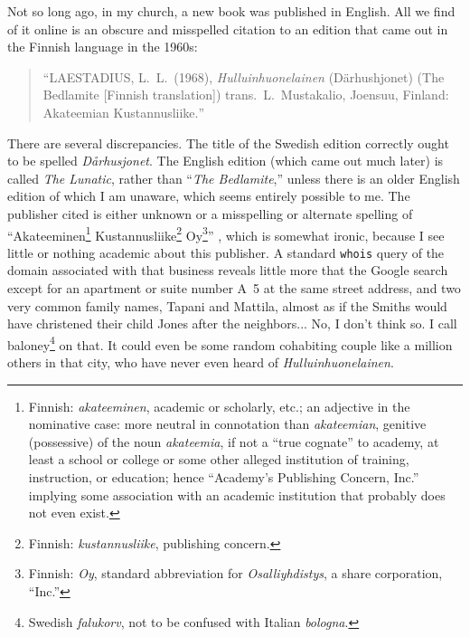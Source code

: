 \documentclass[letterpaper]{article}
\begin{document}
Not so long ago, in my church, a new book was published in English.  All we find of it online is an obscure and misspelled citation \cite{hagglund1994religious} to an edition that came out in the Finnish language in the 1960s:
\begin{verse}
``LAESTADIUS, L.\ L.\ (1968), \foreignlanguage{finnish}{\textit{Hulluinhuonelainen}} \foreignlanguage{swedish}{(D{\"a}rhushjonet)} (The Bedlamite [Finnish translation]) trans.\ \foreignlanguage{finnish}{L.\ Mustakalio, Joensuu,} Finland: \foreignlanguage{finnish}{Akateemian Kustannusliike.}''
\end{verse}
There are several discrepancies. The title of the Swedish edition correctly ought to be spelled \textit{D{\aa}rhusjonet}.  The English edition (which came out much later) is called \textit{The Lunatic}, rather than ``\textit{The Bedlamite},'' unless there is an older English edition of which I am unaware, which seems entirely possible to me.   The publisher cited is either unknown or a misspelling or alternate spelling of ``Akateeminen\footnote{Finnish: \foreignlanguage{finnish}{\textit{akateeminen}}, academic or scholarly, etc.; an adjective in the nominative case: more neutral in connotation than \foreignlanguage{finnish}{\textit{akateemian}}, genitive (possessive) of the noun \foreignlanguage{finnish}{\textit{akateemia}}, if not a ``true cognate'' to academy, at least a school or college or some other alleged institution of training, instruction, or education; hence ``Academy's Publishing Concern, Inc.'' implying some association with an academic institution that probably does not even exist.} Kustannusliike\footnote{Finnish: \foreignlanguage{finnish}{\textit{kustannusliike}}, publishing concern.} Oy\footnote{Finnish: \textit{Oy}, standard abbreviation for \textit{\foreignlanguage{finnish}{Osalliyhdistys}}, a share corporation, ``Inc.''}'' \cite{google2016akateeminen}, which is somewhat ironic, because I see little or nothing academic about this publisher.  A standard \texttt{whois} query of the domain associated with that business reveals little more that the Google search \cite{google2016akateeminen} except for an apartment or suite number A~5 at the same street address, and two very common family names, Tapani and Mattila, almost as if the Smiths would have christened their child Jones after the neighbors...  No, I don't think so.  I call baloney\footnote{Swedish \textit{falukorv}, not to be confused with Italian \textit{bologna}.} on that.  It could even be some random cohabiting couple like a million others in that city, who have never even heard of \foreignlanguage{finnish}{\textit{Hulluinhuonelainen}}.
\end{document}
